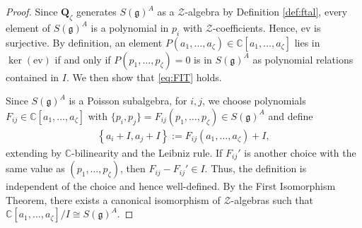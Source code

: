 \documentclass[11pt,reqno]{amsart}
\newtheorem*{theorem A}{Main Theorem A}
\newtheorem*{theorem B}{Main Theorem B}
\newtheorem*{theorem C}{Main Theorem C}
\newtheorem*{theorem D}{Main Theorem D}
\theoremstyle{definition}
\theoremstyle{plain}
\theoremstyle{conclusion}
\begin{document}
\begin{proof}
Since $\mathbf{Q}_\zeta$ generates $S(\mathfrak{g})^A$ as a $\mathcal{Z}$-algebra by Definition \ref{def:ftal}, every element of $S(\mathfrak{g})^A$ is a polynomial in $p_i$ with $\mathcal{Z}$-coefficients. Hence, $\mathrm{ev}$ is surjective. By definition, an element $P(a_1,\dots,a_\zeta)\in \mathbb{C}[a_1,\dots,a_\zeta]$ lies in $\ker(\mathrm{ev})$ if and only if $P(p_1,\dots,p_\zeta)=0$ is in $S(\mathfrak{g})^A$ as polynomial relations contained in $I$. We then show that \eqref{eq:FIT} holds.

 Since $S(\mathfrak{g})^A$ is a Poisson subalgebra, for $i,j$, we choose polynomials $F_{ij}\in \mathbb{C}[a_1,\dots,a_\zeta]$ with $\{p_i,p_j\}=F_{ij}(p_1,\dots,p_\zeta) \in S(\mathfrak{g})^A$ and define \begin{align*}
    \left\{ a_i+I, a_j+I \right\}:=F_{ij}(a_1,\dots,a_\zeta)+I,
\end{align*} extending by $\mathbb{C}$-bilinearity and the Leibniz rule.  If $F_{ij}'$ is another choice with the same value as $(p_1,\dots,p_\zeta)$, then $F_{ij}-F_{ij}'\in I$. Thus, the definition is independent of the choice and hence well-defined. By the First Isomorphism Theorem, there exists a canonical isomorphism of $\mathcal{Z}$-algebras such that $\mathbb{C}[a_1,\dots,a_\zeta]\big/I \cong S(\mathfrak{g})^A$. %
\end{proof}
\end{document}
